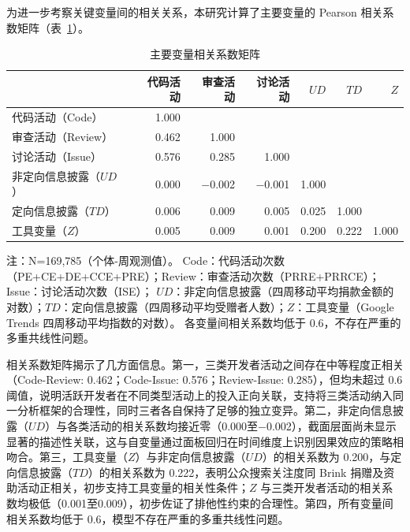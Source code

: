 为进一步考察关键变量间的相关关系，本研究计算了主要变量的 Pearson 相关系数矩阵（表~\ref{tab:correlation}）。

\begin{table}[htbp]
    \centering
    \caption{主要变量相关系数矩阵}
    \label{tab:correlation}
    \small
    \begin{tabularx}{\textwidth}{Xrrrrrr}
        \toprule
        & 代码活动 & 审查活动 & 讨论活动 & $UD$ & $TD$ & $Z$ \\
        \midrule
        代码活动（Code）     & 1.000 & & & & & \\
        审查活动（Review）   & 0.462 & 1.000 & & & & \\
        讨论活动（Issue）    & 0.576 & 0.285 & 1.000 & & & \\
        非定向信息披露（$UD$）  & 0.000 & $-$0.002 & $-$0.001 & 1.000 & & \\
        定向信息披露（$TD$）    & 0.006 & 0.009 & 0.005 & 0.025 & 1.000 & \\
        工具变量（$Z$）        & 0.005 & 0.009 & 0.001 & 0.200 & 0.222 & 1.000 \\
        \bottomrule
    \end{tabularx}
    \begin{minipage}{\textwidth}
        \vspace{0.3em}
        \footnotesize 注：N=169,785（个体-周观测值）。
        Code：代码活动次数（PE+CE+DE+CCE+PRE）；Review：审查活动次数（PRRE+PRRCE）；Issue：讨论活动次数（ISE）；
        $UD$：非定向信息披露（四周移动平均捐款金额的对数）；$TD$：定向信息披露（四周移动平均受赠者人数）；$Z$：工具变量（Google Trends 四周移动平均指数的对数）。
        各变量间相关系数均低于 0.6，不存在严重的多重共线性问题。
    \end{minipage}
\end{table}

相关系数矩阵揭示了几方面信息。第一，三类开发者活动之间存在中等程度正相关（Code-Review: 0.462；Code-Issue: 0.576；Review-Issue: 0.285），但均未超过 0.6 阈值，说明活跃开发者在不同类型活动上的投入正向关联，支持将三类活动纳入同一分析框架的合理性，同时三者各自保持了足够的独立变异。第二，非定向信息披露（$UD$）与各类活动的相关系数均接近零（0.000至$-$0.002），截面层面尚未显示显著的描述性关联，这与自变量通过面板回归在时间维度上识别因果效应的策略相吻合。第三，工具变量（$Z$）与非定向信息披露（$UD$）的相关系数为 0.200，与定向信息披露（$TD$）的相关系数为 0.222，表明公众搜索关注度同 Brink 捐赠及资助活动正相关，初步支持工具变量的相关性条件；$Z$ 与三类开发者活动的相关系数均极低（0.001至0.009），初步佐证了排他性约束的合理性。第四，所有变量间相关系数均低于 0.6，模型不存在严重的多重共线性问题。

